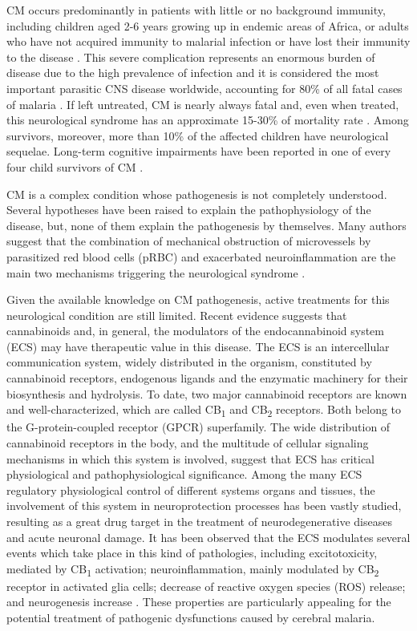 \documentclass[empirical, authordate]{jote-new-article}
\begin{document}
CM occurs predominantly in patients with little or no background immunity, including children aged 2-6 years growing up in endemic areas of Africa, or adults who have not acquired immunity to malarial infection or have lost their immunity to the disease \parencite{Grau1987}. This severe complication represents an enormous burden of disease due to the high prevalence of infection \parencite{Medana2006} and it is considered the most important parasitic CNS disease worldwide, accounting for 80\% of all fatal cases of malaria \parencite{Linares2013}. If left untreated, CM is nearly always fatal and, even when treated, this neurological syndrome has an approximate 15-30\% of mortality rate \parencite{Bartoloni2012}. Among survivors, moreover, more than 10\% of the affected children have neurological sequelae. Long-term cognitive impairments have been reported in one of every four child survivors of CM \parencite{Mariotti2011}.

CM is a complex condition whose pathogenesis is not completely understood. Several hypotheses have been raised to explain the pathophysiology of the disease, but, none of them explain the pathogenesis by themselves. Many authors suggest that the combination of mechanical obstruction of microvessels by parasitized red blood cells (pRBC) and exacerbated neuroinflammation are the main two mechanisms triggering the neurological syndrome \parencite{Combes2006}.

Given the available knowledge on CM pathogenesis, active treatments for this neurological condition are still limited. Recent evidence suggests that cannabinoids and, in general, the modulators of the endocannabinoid system (ECS) may have therapeutic value in this disease. The ECS is an intercellular communication system, widely distributed in the organism, constituted by cannabinoid receptors, endogenous ligands and the enzymatic machinery for their biosynthesis and hydrolysis. To date, two major cannabinoid receptors are known and well-characterized, which are called CB\textsubscript{1} and CB\textsubscript{2} receptors. Both belong to the G-protein-coupled receptor (GPCR) superfamily. The wide distribution of cannabinoid receptors in the body, and the multitude of cellular signaling mechanisms in which this system is involved, suggest that ECS has critical physiological and pathophysiological significance. Among the many ECS regulatory physiological control of different systems organs and tissues, the involvement of this system in neuroprotection processes has been vastly studied, resulting as a great drug target in the treatment of neurodegenerative diseases and acute neuronal damage. It has been observed that the ECS modulates several events which take place in this kind of pathologies, including excitotoxicity, mediated by CB\textsubscript{1} activation; neuroinflammation, mainly modulated by CB\textsubscript{2} receptor in activated glia cells; decrease of reactive oxygen species (ROS) release; and neurogenesis increase \parencite{Fogaça2013}. These properties are particularly appealing for the potential treatment of pathogenic dysfunctions caused by cerebral malaria.
\end{document}
